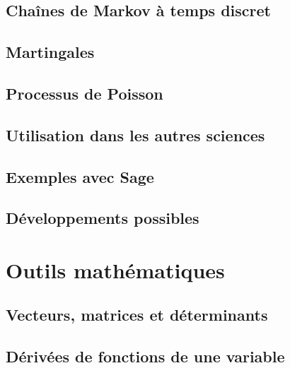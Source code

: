 \chapter{Chaînes de Markov à temps discret}


\chapter{Martingales}


\chapter{Processus de Poisson}


\chapter{Utilisation dans les autres sciences}



\chapter{Exemples avec Sage}



\chapter{Développements possibles}



 
\part{Outils mathématiques} 

\chapter{Vecteurs, matrices et déterminants}
    

\chapter{Dérivées de fonctions de une variable}


